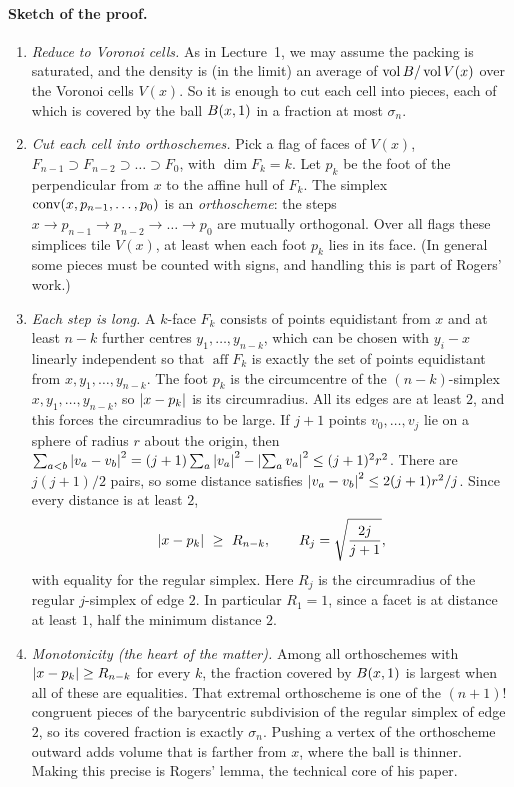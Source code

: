 \paragraph{Sketch of the proof.}
\begin{enumerate}[label=(\arabic*)]
\item \emph{Reduce to Voronoi cells.} As in Lecture~1, we may assume the packing is saturated, and the
  density is (in the limit) an average of $\operatorname{vol}B/\operatorname{vol} V(x)$ over the Voronoi cells $V(x)$. So it
  is enough to cut each cell into pieces, each of which is covered by the ball $B(x,1)$ in a
  fraction at most $\sigma_n$.
\item \emph{Cut each cell into orthoschemes.} Pick a flag of faces of $V(x)$,
  $F_{n-1}\supset F_{n-2}\supset\dots\supset F_0$, with $\dim F_k=k$. Let $p_k$ be the foot of the
  perpendicular from $x$ to the affine hull of $F_k$. The simplex $\operatorname{conv}(x,p_{n-1},\dots,p_0)$ is an
  \emph{orthoscheme}: the steps $x\to p_{n-1}\to p_{n-2}\to\dots\to p_0$ are mutually orthogonal. Over all
  flags these simplices tile $V(x)$, at least when each foot $p_k$ lies in its face. (In general some
  pieces must be counted with signs, and handling this is part of Rogers' work.)
\item \emph{Each step is long.} A $k$-face $F_k$ consists of points equidistant from $x$ and at least
  $n-k$ further centres $y_1,\dots,y_{n-k}$, which can be chosen with $y_i-x$ linearly independent so
  that $\operatorname{aff}F_k$ is exactly the set of points equidistant from $x,y_1,\dots,y_{n-k}$. The foot $p_k$ is the circumcentre of the
  $(n-k)$-simplex $x,y_1,\dots,y_{n-k}$, so $\left\lvert x-p_k \right\rvert$ is its circumradius. All its edges are at
  least $2$, and this forces the circumradius to be large. If $j+1$ points $v_0,\dots,v_j$ lie on a
  sphere of radius $r$ about the origin, then
  $\sum_{a<b}\left\lvert v_a-v_b \right\rvert^2=(j+1)\sum_a\left\lvert v_a \right\rvert^2-\left\lvert \sum_av_a \right\rvert^2\le(j+1)^2r^2$. There are $j(j+1)/2$
  pairs, so some distance satisfies $\left\lvert v_a-v_b \right\rvert^2\le 2(j+1)r^2/j$. Since every distance is at least $2$,
  \[
    \left\lvert x-p_k \right\rvert\ \ge\ R_{n-k},\qquad R_j=\sqrt{\frac{2j}{j+1}},
  \]
  with equality for the regular simplex. Here $R_j$ is the circumradius of the regular $j$-simplex of edge $2$. In particular $R_1=1$, since a facet is at
  distance at least $1$, half the minimum distance $2$.
\item \emph{Monotonicity (the heart of the matter).} Among all orthoschemes with
  $\left\lvert x-p_k \right\rvert\ge R_{n-k}$ for every $k$, the fraction covered by $B(x,1)$ is largest when all of these
  are equalities. That extremal orthoscheme is one of the $(n+1)!$ congruent pieces of the barycentric
  subdivision of the regular simplex of edge $2$, so its covered fraction is exactly $\sigma_n$.
  Pushing a vertex of the orthoscheme outward adds volume that is farther from $x$, where the ball is
  thinner. Making this precise is Rogers' lemma, the technical core of his paper.
\end{enumerate}

